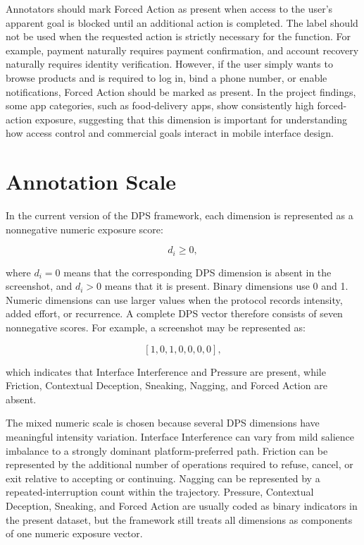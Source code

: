 Annotators should mark Forced Action as present when access to the user's apparent goal is blocked until an additional action is completed. The label should not be used when the requested action is strictly necessary for the function. For example, payment naturally requires payment confirmation, and account recovery naturally requires identity verification. However, if the user simply wants to browse products and is required to log in, bind a phone number, or enable notifications, Forced Action should be marked as present. In the project findings, some app categories, such as food-delivery apps, show consistently high forced-action exposure, suggesting that this dimension is important for understanding how access control and commercial goals interact in mobile interface design.

\section{Annotation Scale}

In the current version of the DPS framework, each dimension is represented as a nonnegative numeric exposure score:

\[
d_i \geq 0,
\]

where \(d_i = 0\) means that the corresponding DPS dimension is absent in the screenshot, and \(d_i>0\) means that it is present. Binary dimensions use 0 and 1. Numeric dimensions can use larger values when the protocol records intensity, added effort, or recurrence. A complete DPS vector therefore consists of seven nonnegative scores. For example, a screenshot may be represented as:

\[
[1, 0, 1, 0, 0, 0, 0],
\]

which indicates that Interface Interference and Pressure are present, while Friction, Contextual Deception, Sneaking, Nagging, and Forced Action are absent.

The mixed numeric scale is chosen because several DPS dimensions have meaningful intensity variation. Interface Interference can vary from mild salience imbalance to a strongly dominant platform-preferred path. Friction can be represented by the additional number of operations required to refuse, cancel, or exit relative to accepting or continuing. Nagging can be represented by a repeated-interruption count within the trajectory. Pressure, Contextual Deception, Sneaking, and Forced Action are usually coded as binary indicators in the present dataset, but the framework still treats all dimensions as components of one numeric exposure vector.

